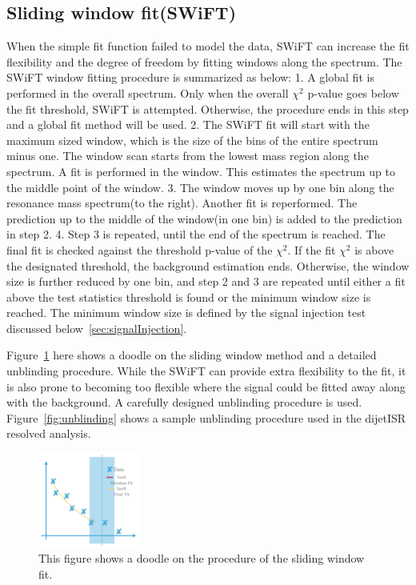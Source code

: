     \subsection{Sliding window fit(SWiFT)}
    When the simple fit function failed to model the data, SWiFT can increase the fit flexibility and the degree of freedom by fitting windows along the spectrum. The SWiFT window fitting procedure is summarized as below:
    1. A global fit is performed in the overall spectrum. Only when the overall $\chi^{2}$ p-value goes below the fit threshold, SWiFT is attempted. Otherwise, the procedure ends in this step and a global fit method will be used. 
    2. The SWiFT fit will start with the maximum sized window, which is the size of the bins of the entire spectrum minus one. The window scan starts from the lowest mass region along the spectrum. A fit is performed in the window. This estimates the spectrum up to the middle point of the window.
    3. The window moves up by one bin along the resonance mass spectrum(to the right). Another fit is reperformed. The prediction up to the middle of the window(in one bin) is added to the prediction in step 2. 
    4. Step 3 is repeated, until the end of the spectrum is reached. The final fit is checked against the threshold p-value of the $\chi^{2}$. If the fit $\chi^{2}$ is above the designated threshold, the background estimation ends. Otherwise, the window size is further reduced by one bin, and step 2 and 3 are repeated until either a fit above the test statistics threshold is found or the minimum window size is reached. The minimum window size is defined by the signal injection test discussed below~\ref{sec:signalInjection}.

    Figure~\ref{fig:swift} here shows a doodle on the sliding window method and a detailed unblinding procedure. 
    While the SWiFT can provide extra flexibility to the fit, it is also prone to becoming too flexible where the signal could be fitted away along with the background. A carefully designed unblinding procedure is used. Figure~\ref{fig:unblinding} shows a sample unblinding procedure used in the dijetISR resolved analysis. 

\begin{figure}[!htb]
    \begin{center}
        \includegraphics[width=0.3\textwidth]{figures/chapter_analysismethod/swift2}
        \caption{
            This figure shows a doodle on the procedure of the sliding window fit. 
        }
        \label{fig:swift}
    \end{center}
\end{figure}
\FloatBarrier

